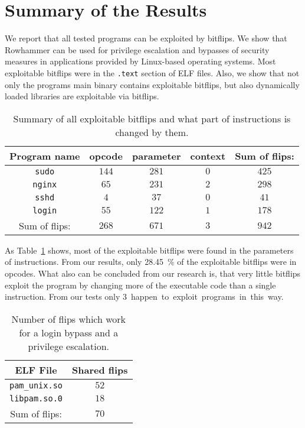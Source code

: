 \section{Summary of the Results}

We report that all tested programs can be exploited by bitflips. We show that
Rowhammer can be used for privilege escalation and bypasses of security measures
in applications provided by Linux-based operating systems. Most exploitable
bitflips were in the \texttt{.text} section of ELF files. Also, we show that not
only the program\textquotesingle s main binary contains exploitable bitflips,
but also dynamically loaded libraries are exploitable via bitflips.

\begin{table}[!htb]
\centering
\begin{tabular}{c|ccc|c}
Program name & opcode & parameter & context & Sum of flips: \\ \hline
\texttt{sudo}  & $144$ & $281$ & $0$ & $425$ \\
\texttt{nginx} & $65$  & $231$ & $2$ & $298$ \\
\texttt{sshd}  & $4$   & $37$  & $0$ & $41$  \\
\texttt{login} & $55$  & $122$ & $1$ & $178$ \\ \hline
Sum of flips:  & $268$ & $671$ & $3$ & $942$
\end{tabular}
\caption{Summary of all exploitable bitflips and what part of instructions is
changed by them.}
\label{tab:summaryflips}
\end{table}

As Table~\ref{tab:summaryflips} shows, most of the exploitable bitflips were
found in the parameters of instructions. From our results, only
\SI{28.45}{\percent} of the exploitable bitflips were in opcodes. What also can
be concluded from our research is, that very little bitflips exploit the program
by changing more of the executable code than a single instruction. From our
tests only \SI{3} happen to exploit programs in this way.

\begin{table}[!htb]
\centering
\begin{tabular}{c|c}
ELF File               & Shared flips \\ \hline
\texttt{pam\_unix.so} & $52$ \\
\texttt{libpam.so.0} & $18$ \\ \hline
Sum of flips:                 & $70$
\end{tabular}
\caption{Number of flips which work for a login bypass and a 
privilege escalation.}
\label{tab:loginsudo}
\end{table}

